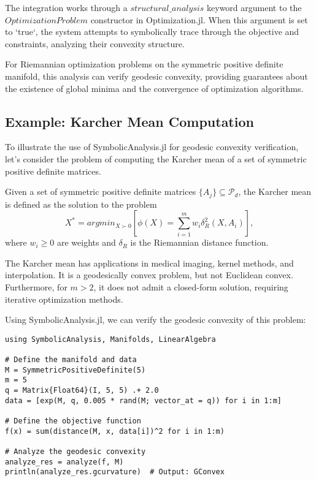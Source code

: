 The integration works through a $structural\_analysis$ keyword argument to the $OptimizationProblem$ constructor in Optimization.jl. When this argument is set to `true`, the system attempts to symbolically trace through the objective and constraints, analyzing their convexity structure.

For Riemannian optimization problems on the symmetric positive definite manifold, this analysis can verify geodesic convexity, providing guarantees about the existence of global minima and the convergence of optimization algorithms.

\subsection{Example: Karcher Mean Computation}

To illustrate the use of SymbolicAnalysis.jl for geodesic convexity verification, let's consider the problem of computing the Karcher mean of a set of symmetric positive definite matrices.

Given a set of symmetric positive definite matrices $\{A_j\} \subseteq \mathcal{P}_d$, the Karcher mean is defined as the solution to the problem
\begin{equation}
X^* = argmin_{X \succ 0} \left[ \phi(X) = \sum_{i=1}^m w_i \delta_R^2(X, A_i) \right],
\end{equation}
where $w_i \geq 0$ are weights and $\delta_R$ is the Riemannian distance function.

The Karcher mean has applications in medical imaging, kernel methods, and interpolation. It is a geodesically convex problem, but not Euclidean convex. Furthermore, for $m > 2$, it does not admit a closed-form solution, requiring iterative optimization methods.

Using SymbolicAnalysis.jl, we can verify the geodesic convexity of this problem:

\begin{verbatim}
using SymbolicAnalysis, Manifolds, LinearAlgebra

# Define the manifold and data
M = SymmetricPositiveDefinite(5)
m = 5
q = Matrix{Float64}(I, 5, 5) .+ 2.0
data = [exp(M, q, 0.005 * rand(M; vector_at = q)) for i in 1:m]

# Define the objective function
f(x) = sum(distance(M, x, data[i])^2 for i in 1:m)

# Analyze the geodesic convexity
analyze_res = analyze(f, M)
println(analyze_res.gcurvature)  # Output: GConvex
\end{verbatim}

